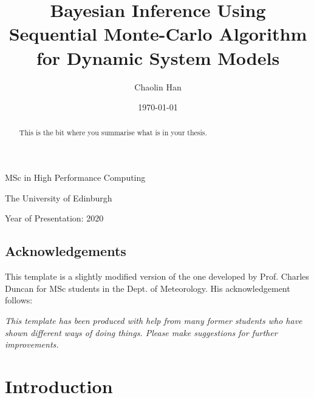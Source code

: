 \documentclass[12pt,a4paper]{report}
\begin{document}

\title{Bayesian Inference Using Sequential Monte-Carlo Algorithm for Dynamic System Models}

\author{Chaolin Han}

\date{\today}

\makeEPCCtitle

\thispagestyle{empty}

\vspace{11cm}

\begin{center}

    \large{MSc in High Performance Computing}

    \large{The University of Edinburgh}

    \large{Year of Presentation: 2020}

\end{center}

\newpage

\begin{abstract}
    This is the bit where you summarise what is in your thesis.
\end{abstract}


\tableofcontents
\listoftables
\listoffigures

\begin{titlepage}
    \vspace*{2in}
    \section*{Acknowledgements}

    This template is a slightly modified version of the one developed by
    Prof. Charles Duncan for MSc students in the Dept. of Meteorology. His
    acknowledgement follows:

    {\em This template has been produced with help from many former students who
    have shown different ways of doing things. Please make suggestions for
    further improvements.}

\end{titlepage}


\chapter{Introduction}
\end{document}
